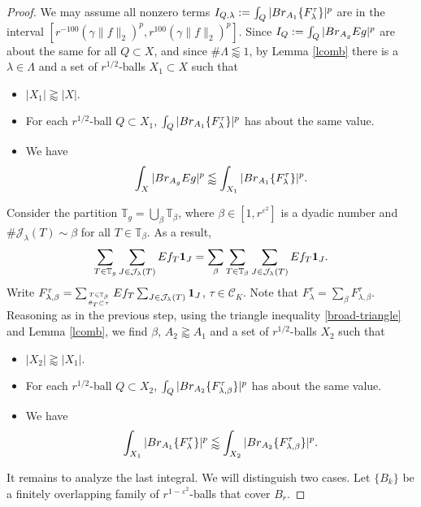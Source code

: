 \documentclass[10pt,a4paper]{amsart}
\newcommand{\Br}{{\rm{Br}}}
\newcommand{\Id}{{\bf{1}}}
\newcommand{\ZT}{\mathbb{T}}
\newcommand{\be}{\beta}
\newcommand{\cC}{{\mathcal C}}
\newcommand{\cj}{\mathcal J}
\newcommand{\e}{\varepsilon}
\newcommand{\la}{\lambda}
\begin{document}
\begin{proof}
    We may assume all nonzero terms $I_{Q,\lambda}:=\int_{Q}|\Br_{A_1} \{F_\lambda^{\tau}\}|^p$ are in the interval $[r^{-100}(\gamma\|f\|_2)^p,r^{100}(\gamma\|f\|_2)^p]$.    
	Since $I_Q:=\int_{Q}|\Br_{A_g} Eg|^p$ are about the same for all $Q\subset X$, and since $\#\Lambda\lessapprox 1$, by Lemma \ref{lcomb} there is a $\la\in\Lambda$ and a set of $r^{1/2}$-balls $X_1\subset X$ such that 
	\begin{itemize}
		\item $|X_1|\gtrapprox|X|$.
		\item For each $r^{1/2}$-ball $Q\subset X_1$, 
        $\int_{Q}|\Br_{A_1} \{F_\lambda^{\tau}\}|^p
        $ has about the same value.
		\item We have
		\begin{equation}			
			\int_{X}|\Br_{A_g} Eg|^p\lessapprox\int_{X_1}|\Br_{A_1} \{F_\lambda^{\tau}\}|^p.
		\end{equation}
	\end{itemize}
	Consider the partition $\ZT_g=\bigcup_\be\ZT_{\be}$, where $\be\in[1,r^{\e^2}]$ is a dyadic number and $\#\cj_\la(T)\sim\be$ for all $T\in\ZT_{\be}$. 
	As a result, 
	\begin{equation}
		\nonumber
		\sum_{T\in\ZT_g}\sum_{J\in\cj_\la(T)}Ef_{T}\Id_J=\sum_\be\sum_{T\in\ZT_{\be}}\sum_{J\in\cj_\la(T)}Ef_{T}\Id_J.    
	\end{equation}Write $F_{\lambda,\beta}^\tau=\sum_{T\in\ZT_\beta\atop{\theta_T\subset\tau}}Ef_{T}\sum_{J\in\cj_\la(T)}\Id_J$, $\tau\in\cC_K$. Note that $F_\lambda^\tau=\sum_{\beta}F_{\lambda,\beta}^{\tau}$.
	Reasoning as in the previous step, using the triangle  inequality \eqref{broad-triangle} and  Lemma \ref{lcomb}, 
     we find  $\be$, $A_2\gtrapprox A_1$ and a set of $r^{1/2}$-balls $X_2$ such that 
	\begin{itemize}
		\item $|X_2|\gtrapprox|X_1|$.
		\item For each $r^{1/2}$-ball $Q\subset X_2$, $\int_{Q}|\Br_{A_2} \{F_{\lambda,\beta}^{\tau}\}|^p$ has about the same value.
		\item We have
		\begin{equation}
			\label{reduction-2}
			\int_{X_1}|\Br_{A_1} \{F_\lambda^{\tau}\}|^p\lessapprox\int_{X_2}|\Br_{A_2} \{F_{\lambda,\beta}^{\tau}\}|^p .
		\end{equation}
	\end{itemize}
	
	\smallskip
    
    It remains to analyze the last integral. We will distinguish two cases.
	Let $\{B_k\}$ be a finitely overlapping family of $r^{1-\e^2}$-balls that cover $B_r$. 
	\medskip
	

\end{proof}
\end{document}
